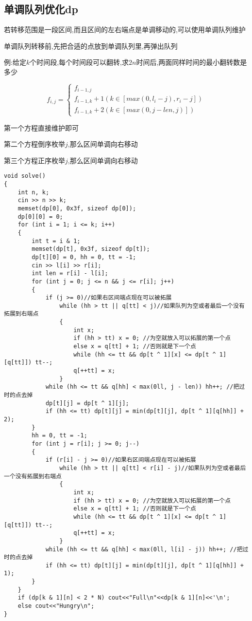 \documentclass[a4paper,fontset=none]{ctexart}
\begin{document}
\subsection{单调队列优化dp}
若转移范围是一段区间,而且区间的左右端点是单调移动的,可以使用单调队列维护

单调队列转移前,先把合适的点放到单调队列里,再弹出队列

例:给定$k$个时间段,每个时间段可以翻转,求$2n$时间后,两面同样时间的最小翻转数是多少

\begin{equation}  
f_{i,j}=\left\{  
        \begin{array}{lr}
        f_{i-1,j}\\
        f_{i-1,k}+1(k\in[max(0,l_i-j),r_i-j])\\
        f_{i-1,k}+2(k\in[max(0,j-len,j)])
        \end{array}  
\right.  
\end{equation} 

第一个方程直接维护即可

第二个方程倒序枚举$j$,那么区间单调向右移动

第三个方程正序枚举$j$,那么区间单调向右移动


\begin{verbatim}
void solve()
{
    int n, k;
    cin >> n >> k;
    memset(dp[0], 0x3f, sizeof dp[0]);
    dp[0][0] = 0;
    for (int i = 1; i <= k; i++)
    {
        int t = i & 1;
        memset(dp[t], 0x3f, sizeof dp[t]);
        dp[t][0] = 0, hh = 0, tt = -1;
        cin >> l[i] >> r[i];
        int len = r[i] - l[i];
        for (int j = 0; j <= n && j <= r[i]; j++)
        {
            if (j >= 0)//如果右区间端点现在可以被拓展
                while (hh > tt || q[tt] < j)//如果队列为空或者最后一个没有拓展到右端点
                {
                    int x;
                    if (hh > tt) x = 0; //为空就放入可以拓展的第一个点
                    else x = q[tt] + 1; //否则就是下一个点
                    while (hh <= tt && dp[t ^ 1][x] <= dp[t ^ 1][q[tt]]) tt--;
                    q[++tt] = x;
                }
            while (hh <= tt && q[hh] < max(0ll, j - len)) hh++; //把过时的点去掉
            dp[t][j] = dp[t ^ 1][j];
            if (hh <= tt) dp[t][j] = min(dp[t][j], dp[t ^ 1][q[hh]] + 2);
        }
        hh = 0, tt = -1;
        for (int j = r[i]; j >= 0; j--)
        {
            if (r[i] - j >= 0)//如果右区间端点现在可以被拓展
                while (hh > tt || q[tt] < r[i] - j)//如果队列为空或者最后一个没有拓展到右端点
                {
                    int x;
                    if (hh > tt) x = 0; //为空就放入可以拓展的第一个点
                    else x = q[tt] + 1; //否则就是下一个点
                    while (hh <= tt && dp[t ^ 1][x] <= dp[t ^ 1][q[tt]]) tt--;
                    q[++tt] = x;
                }
            while (hh <= tt && q[hh] < max(0ll, l[i] - j)) hh++; //把过时的点去掉
            if (hh <= tt) dp[t][j] = min(dp[t][j], dp[t ^ 1][q[hh]] + 1);
        }
    }
    if (dp[k & 1][n] < 2 * N) cout<<"Full\n"<<dp[k & 1][n]<<'\n';
    else cout<<"Hungry\n";
}
\end{verbatim}
\end{document}

